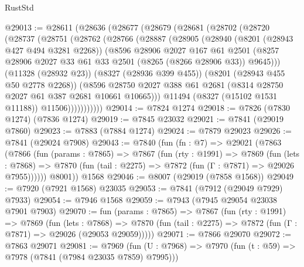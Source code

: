 \begin{lexlean}{RustStd}
\begin{coremodule}
@29013 := @28611
    (@28636
      (@28677
        (@28679
          (@28681
            (@28702
              (@28720
                (@28737
                  (@28751
                    (@28762
                      (@28766
                        (@28887
                          (@28905
                            (@28940
                              (@8201 (@28943 @427 @494 @3281 @2268))
                              (@8596
                                @28906
                                @2027
                                @167
                                @61
                                @2501
                                (@8257
                                  @28906
                                  @2027
                                  @33
                                  @61
                                  @33
                                  @2501
                                  (@8265 (@8266 @28906 @33))
                                  @9645)))
                            (@11328 (@28932 @23))
                            (@8327 (@28936 @399 @455))
                            (@8201 (@28943 @455 @50 @2778 @2268))
                            (@8596
                              @28750
                              @2027
                              @388
                              @61
                              @2681
                              (@8314 @28750 @2027 @61 @387 @2681 @10661 @10665)))
                          @11494
                          (@8327 (@15102 @1531 @11188))
                          @11506)))))))))))
@29014 := @7824 @1274
@29018 := @7826 (@7830 @1274) (@7836 @1274)
@29019 := @7845 @23032
@29021 := @7841 (@29019 @7860)
@29023 := @7883 (@7884 @1274)
@29024 := @7879 @29023
@29026 := @7841 (@29024 @7908)
@29043 := @7840
    (fun (fn : @7) =>
    @29021
      (@7863
        (@7866
          (fun (params : @7865) =>
          @7867
            (fun (rty : @1991) =>
            @7869
              (fun (lets : @7868) =>
              @7870 (fun (tail : @2275) => @7872 (fun (Γ : @7871) => @29026 @7955))))))
        @8001))
    @1568
@29046 := @8007 (@29019 (@7858 @1568))
@29049 := @7920 (@7921 @1568) @23035
@29053 := @7841 (@7912 (@29049 @7929) @7933)
@29054 := @7946 @1568
@29059 := @7943 (@7945 @29054 @23038 @7901 @7903)
@29070 := fun (params : @7865) =>
  @7867
    (fun (rty : @1991) =>
    @7869
      (fun (lets : @7868) =>
      @7870 (fun (tail : @2275) => @7872 (fun (Γ : @7871) => @29026 (@29053 @29059)))))
@29071 := @7866 @29070
@29072 := @7863 @29071
@29081 := @7969
    (fun (U : @7968) => @7970 (fun (t : @59) => @7978 (@7841 (@7984 @23035 @7859) @7995)))

\end{coremodule}
\end{lexlean}
